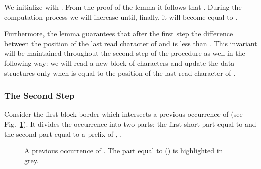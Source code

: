 \documentclass[10pt]{llncs}
\begin{document}
We initialize  with . From the proof of the lemma it follows that . During the computation process we will increase  until, finally, it will become equal to .

Furthermore, the lemma guarantees that after the first step the difference between the position of the last read character of  and  is less than . This invariant will be maintained throughout the second step of the procedure as well in the following way: we will read a new block of characters and update the data structures only when  is equal to the position of the last read character of .

\subsubsection{The Second Step}
Consider the first block border which intersects a previous occurrence of  (see Fig.~\ref{fig:LM3}). It divides the occurrence into two parts: the first short part equal to  and the second part equal to a prefix of , .

\begin{figure}[h!]
    \begin{center}
             \caption{A previous occurrence of . The part equal to  () is highlighted in grey.}
      \label{fig:LM3}
    \end{center}
\end{figure}
\end{document}
